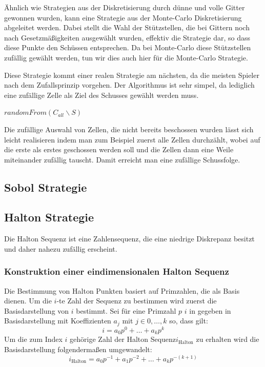 \documentclass[a4paper,12pt]{llncs}
\numberwithin{equation}{section}
\begin{document}
Ähnlich wie Strategien aus der Diskretisierung durch dünne und volle Gitter gewonnen wurden, kann eine Strategie aus der Monte-Carlo Diskretisierung abgeleitet werden. Dabei stellt die Wahl der Stützstellen, die bei Gittern noch nach Gesetzmäßigkeiten ausgewählt wurden, effektiv die Strategie dar, so dass diese Punkte den Schüssen entsprechen. Da bei Monte-Carlo diese Stützstellen zufällig gewählt werden, tun wir dies auch hier für die Monte-Carlo Strategie. 

Diese Strategie kommt einer realen Strategie am nächsten, da die meisten Spieler nach dem Zufallsprinzip vorgehen. Der Algorithmus ist sehr simpel, da lediglich eine zufällige Zelle als Ziel des Schusses gewählt werden muss.

\begin{tcolorbox}
	\begin{algorithmic}
		\State \Return $randomFrom(C_{all}\backslash S)$
		\EndFunction
	\end{algorithmic}
\end{tcolorbox}

Die zufällige Auswahl von Zellen, die nicht bereits beschossen wurden lässt sich leicht realisieren indem man zum Beispiel zuerst alle Zellen durchzählt, wobei auf die erste als erstes geschossen werden soll und die Zellen dann eine Weile miteinander zufällig tauscht. Damit erreicht man eine zufällige Schussfolge.


\subsection{Sobol Strategie}

\subsection{Halton Strategie}
Die Halton Sequenz ist eine Zahlensequenz, die eine niedrige Diskrepanz besitzt und daher nahezu zufällig erscheint.

\subsubsection{Konstruktion einer eindimensionalen Halton Sequenz}
Die Bestimmung von Halton Punkten basiert auf Primzahlen, die als Basis dienen. Um die $i$-te Zahl der Sequenz zu bestimmen wird zuerst die Basisdarstellung von $i$ bestimmt. Sei für eine Primzahl $p$ $i$ in gegeben in Basisdarstellung mit Koeffizienten $a_j$ mit $j\in{0,\dots,k}$ so, dass gilt:
\begin{equation}
i = a_0p^0+\dots+a_kp^k
\end{equation}
Um die zum Index $i$ gehörige Zahl der Halton Sequenz$ i_{\text{Halton}}$ zu erhalten wird die Basisdarstellung folgendermaßen umgewandelt:
\begin{equation}
i_{\text{Halton}} = a_0p^{-1}+a_1p^{-2} + \dots+a_kp^{-(k+1)}
\end{equation}
\end{document}
